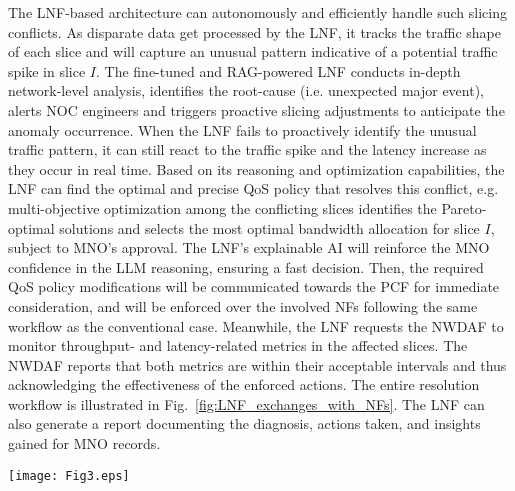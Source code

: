 The \gls{LNF}-based architecture can autonomously and efficiently handle such slicing conflicts. As disparate data get processed by the \gls{LNF}, it tracks the traffic shape of each slice and will capture an unusual pattern indicative of a potential traffic spike in slice $I$. The fine-tuned and \gls{RAG}-powered \gls{LNF} conducts in-depth network-level analysis, identifies the root-cause (i.e. unexpected major event), alerts \gls{NOC} engineers and triggers proactive slicing adjustments to anticipate the anomaly occurrence. When the \gls{LNF} fails to proactively identify the unusual traffic pattern, it can still react to the traffic spike and the latency increase as they occur in real time. Based on its reasoning and optimization capabilities, the \gls{LNF} can find the optimal and precise \gls{QoS} policy that resolves this conflict, e.g. multi-objective optimization among the conflicting slices identifies the Pareto-optimal solutions and selects the most optimal bandwidth allocation for slice $I$, subject to \gls{MNO}'s approval. The \gls{LNF}'s explainable \gls{AI} will reinforce the \gls{MNO} confidence in the \gls{LLM} reasoning, ensuring a fast decision. Then, the required \gls{QoS} policy modifications will be communicated towards the \gls{PCF} for immediate consideration, and will be enforced over the involved \glspl{NF} following the same workflow as the conventional case. Meanwhile, the \gls{LNF} requests the \gls{NWDAF} to monitor throughput- and latency-related metrics in the affected slices. The \gls{NWDAF} reports that both metrics are within their acceptable intervals and thus acknowledging the effectiveness of the enforced actions. The entire resolution workflow is illustrated in Fig.~\ref{fig:LNF_exchanges_with_NFs}. The \gls{LNF} can also generate a report documenting the diagnosis, actions taken, and insights gained for \gls{MNO} records.
\begin{figure*}[t!]
\centering
\texttt{[image: Fig3.eps]}
    \caption{Workflow of \gls{LNF} autonomous operation for anomaly detection, diagnosis and resolution.}
    \label{fig:LNF_exchanges_with_NFs}
\end{figure*}
